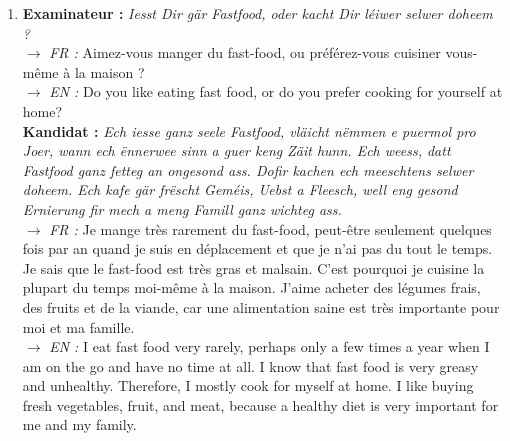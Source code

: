 \begin{enumerate}
    \item \textbf{Examinateur :} \textit{Iesst Dir gär Fastfood, oder kacht Dir léiwer selwer doheem ?} \\
    $\rightarrow$ \textit{FR :} Aimez-vous manger du fast-food, ou préférez-vous cuisiner vous-même à la maison ? \\
    $\rightarrow$ \textit{EN :} Do you like eating fast food, or do you prefer cooking for yourself at home? \\
    \textbf{Kandidat :} \textit{Ech iesse ganz seele Fastfood, vläicht nëmmen e puermol pro Joer, wann ech ënnerwee sinn a guer keng Zäit hunn. Ech weess, datt Fastfood ganz fetteg an ongesond ass. Dofir kachen ech meeschtens selwer doheem. Ech kafe gär frëscht Geméis, Uebst a Fleesch, well eng gesond Ernierung fir mech a meng Famill ganz wichteg ass.} \\
    $\rightarrow$ \textit{FR :} Je mange très rarement du fast-food, peut-être seulement quelques fois par an quand je suis en déplacement et que je n'ai pas du tout le temps. Je sais que le fast-food est très gras et malsain. C'est pourquoi je cuisine la plupart du temps moi-même à la maison. J'aime acheter des légumes frais, des fruits et de la viande, car une alimentation saine est très importante pour moi et ma famille. \\
    $\rightarrow$ \textit{EN :} I eat fast food very rarely, perhaps only a few times a year when I am on the go and have no time at all. I know that fast food is very greasy and unhealthy. Therefore, I mostly cook for myself at home. I like buying fresh vegetables, fruit, and meat, because a healthy diet is very important for me and my family.

    \vspace{0.4em}


\end{enumerate}
